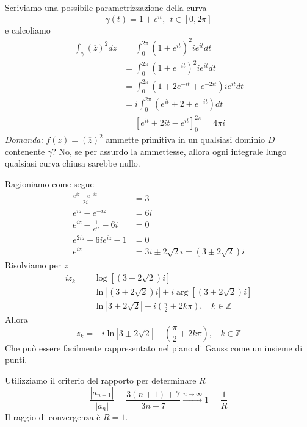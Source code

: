 Scriviamo una possibile parametrizzazione della curva
\begin{equation*}
\gamma \left( t\right) =1+e^{it} ,\ \ t\in \left[ 0,2\pi \right]
\end{equation*}
e calcoliamo
\begin{align*}
\int\nolimits _{\gamma }\left(\overline{z}\right)^{2} dz & =\int\nolimits ^{2\pi }_{0}\left(\overline{1+e^{it}}\right)^{2} ie^{it} dt\\
 & =\int\nolimits ^{2\pi }_{0}\left( 1+e^{-it}\right)^{2} ie^{it} dt\\
 & =\int\nolimits ^{2\pi }_{0}\left( 1+2e^{-it} +e^{-2it}\right) ie^{it} dt\\
 & =i\int\nolimits ^{2\pi }_{0}\left( e^{it} +2+e^{-it}\right) dt\\
 & =\left[ e^{it} +2it-e^{it}\right]^{2\pi }_{0} =4\pi i
\end{align*}
\textit{Domanda:} $f\left( z\right) =\left(\overline{z}\right)^{2}$ ammette primitiva in un qualsiasi dominio $D$ contenente $\gamma $? No, se per assurdo la ammettesse, allora ogni integrale lungo qualsiasi curva chiusa sarebbe nullo.
\Soluzione

Ragioniamo come segue
\begin{align*}
\frac{e^{iz} -e^{-iz}}{2i} & =3\\
e^{iz} -e^{-iz} & =6i\\
e^{iz} -\frac{1}{e^{iz}} -6i & =0\\
e^{2iz} -6ie^{iz} -1 & =0\\
e^{iz} & =3i\pm 2\sqrt{2} i=\left( 3\pm 2\sqrt{2}\right) i
\end{align*}
Risolviamo per $z$
\begin{align*}
iz_{k} & =\log\left[\left( 3\pm 2\sqrt{2}\right) i\right]\\
 & =\ln\left| \left( 3\pm 2\sqrt{2}\right) i\right| +i\arg\left[\left( 3\pm 2\sqrt{2}\right) i\right]\\
 & =\ln\left| 3\pm 2\sqrt{2}\right| +i\left(\frac{\pi }{2} +2k\pi \right) ,\ \ \ \ k\in \mathbb{Z}
\end{align*}
Allora
\begin{equation*}
z_{k} =-i\ln\left| 3\pm 2\sqrt{2}\right| +\left(\frac{\pi }{2} +2k\pi \right) ,\ \ \ \ k\in \mathbb{Z}
\end{equation*}
Che può essere facilmente rappresentato nel piano di Gauss come un insieme di punti.
\Soluzione

Utilizziamo il criterio del rapporto per determinare $R$
\begin{equation*}
\frac{\left| a_{n+1}\right| }{\left| a_{n}\right| } =\frac{3\left( n+1\right) +7}{3n+7}\xrightarrow{n\rightarrow \infty } 1=\frac{1}{R}
\end{equation*}
Il raggio di convergenza è $R=1$.

